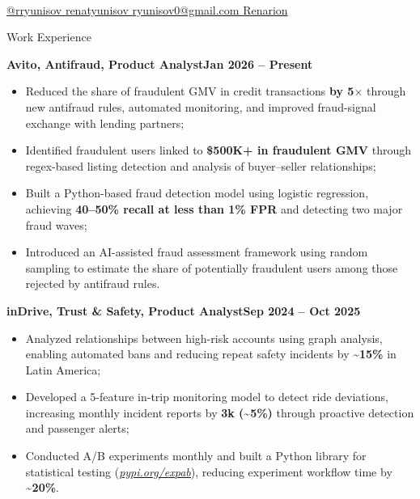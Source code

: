 \documentclass[]{mcdowellcv}
\makeatletter
\renewenvironment{cvsubsection}[2]{%
  \begin{adjustwidth}{\subsectionmargin}{\subsectionmargin}%
    {\bfseries #1}\hfill #2\par\vspace{1em}%
}{%
  \end{adjustwidth}%
  \vspace*{\aftersubsectionspace}%
}
\renewcommand{\makeheader}{%
  \begin{center}
    \printname\\[0.5em]%
    \printcontacts%
  \end{center}%
  \vspace*{\afterheaderspace}%
}
\renewcommand{\makeheader}{%
  \begin{center}
    \printname\\[0.55em]%
    {\color{contactblue}\normalsize
      \href{https://t.me/rryunisov}{%
        \faTelegram\enspace @rryunisov%
      }%
      \hspace{2em}%
      {\color{black}\textbar}%
      \hspace{2em}%
      \href{https://www.linkedin.com/in/renatyunisov/}{%
        \faLinkedin\enspace renatyunisov%
      }%
      \hspace{2em}%
      {\color{black}\textbar}%
      \hspace{2em}%
      \href{mailto:ryunisov0@gmail.com}{%
        \faEnvelope\enspace ryunisov0@gmail.com%
      }%
      \hspace{2em}%
      {\color{black}\textbar}%
      \hspace{2em}%
      \href{https://github.com/Renarion}{%
        \faGithub\enspace Renarion%
      }%
    }%
  \end{center}%
  \vspace*{\afterheaderspace}%
}
\makeatother
\begin{document}
	\makeheader
	
    	\begin{cvsection}{\Large Work Experience}
            \begin{cvsubsection}{Avito, Antifraud, Product Analyst}{\textbf{Jan 2026 -- Present}}
          \begin{itemize}[itemsep=0.2em]
            \item Reduced the share of fraudulent GMV in credit transactions \textbf{by 5$\times$} through new antifraud rules, automated monitoring, and improved fraud-signal exchange with lending partners;
            \item Identified fraudulent users linked to \textbf{\$500K+ in fraudulent GMV} through regex-based listing detection and analysis of buyer--seller relationships;
            \item Built a Python-based fraud detection model using logistic regression, achieving \textbf{40--50\% recall at less than 1\% FPR} and detecting two major fraud waves;
            \item Introduced an AI-assisted fraud assessment framework using random sampling to estimate the share of potentially fraudulent users among those rejected by antifraud rules.
          \end{itemize}
            \end{cvsubsection}
        
		\begin{cvsubsection}{inDrive, Trust \& Safety, Product Analyst}{\textbf{Sep 2024 -- Oct 2025}}
			\begin{itemize}[itemsep=0.2em]
				\item Analyzed relationships between high-risk accounts using graph analysis, enabling automated bans and reducing repeat safety incidents by \textbf{\textasciitilde 15\%} in Latin America;
				\item Developed a 5-feature in-trip monitoring model to detect ride deviations, increasing monthly incident reports by \textbf{3k (\textasciitilde 5\%)} through proactive detection and passenger alerts;
				\item Conducted A/B experiments monthly and built a Python library for statistical testing (\href{https://pypi.org/project/expab/}{\textit{\underline{pypi.org/expab}}}), reducing experiment workflow time by \textbf{\textasciitilde 20\%}.
			\end{itemize}
		\end{cvsubsection}
		

\end{cvsection}
\end{document}
